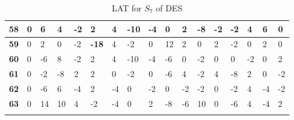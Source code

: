 \begin{longtable}[c]{|l|l|l|l|l|l|l|l|l|l|l|l|l|l|l|l|l|}
\textbf{58} & 0          & 6          & 4          & -2         & 2          & 4          & -10        & -4         & 0          & 2          & -8          & -2          & -2          & 4           & 6           & 0           \\ \hline
\textbf{59} & 0          & 2          & 0          & -2         & \textbf{-18}        & 4          & -2         & 0          & 12         & 2          & 0           & 2           & -2          & 0           & 2           & 0           \\ \hline
\textbf{60} & 0          & -6         & 8          & -2         & 2          & 4          & -10        & -4         & -6         & 0          & -2          & 0           & 0           & -2          & 0           & 2           \\ \hline
\textbf{61} & 0          & -2         & -8         & 2          & 2          & 0          & -2         & 0          & -6         & 4          & -2          & 4           & -8          & 2           & 0           & -2          \\ \hline
\textbf{62} & 0          & -6         & 6          & -4         & 2          & -4         & 0          & -2         & 0          & -2         & -2          & 0           & -2          & 4           & -4          & -2          \\ \hline
\textbf{63} & 0          & 14         & 10         & 4          & -2         & -4         & 0          & 2          & -8         & -6         & 10          & 0           & -6          & 4           & -4          & 2           \\ \hline
\caption{LAT for $S_7$ of DES}
\label{tbl:lat7}
\end{longtable}
